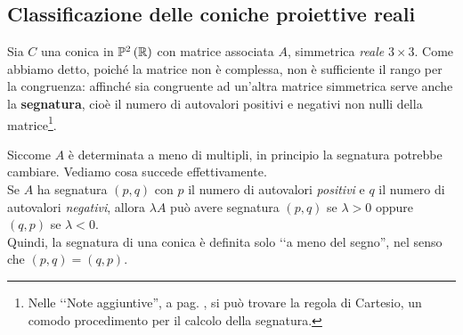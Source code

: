 \subsection{Classificazione delle coniche proiettive reali}
Sia $C$ una conica in $\proj[2]{\realset}$ con matrice associata $A$, simmetrica \textit{reale} $3\times 3$. Come abbiamo detto, poiché la matrice non è complessa, non è sufficiente il rango per la congruenza: affinché sia congruente ad un'altra matrice simmetrica serve anche la \textbf{segnatura}, cioè il numero di autovalori positivi e negativi non nulli della matrice\footnote{Nelle ‘‘Note aggiuntive'', a pag. \pageref{Cartesioquellodeibidonidellacarta}, si può trovare la regola di Cartesio, un comodo procedimento per il calcolo della segnatura.}.
\begin{observe}
Siccome $A$ è determinata a meno di multipli, in principio la segnatura potrebbe cambiare. Vediamo cosa succede effettivamente.\\
Se $A$ ha segnatura $(p,q)$ con $p$ il numero di autovalori \textit{positivi} e $q$ il numero di autovalori \textit{negativi}, allora $\lambda A$ può avere segnatura $(p,q)$ se $\lambda>0$ oppure $(q,p)$ se $\lambda <0$.\\
Quindi, la segnatura di una conica è definita solo ‘‘a meno del segno'', nel senso che $(p,q)=(q,p)$.
\end{observe}
